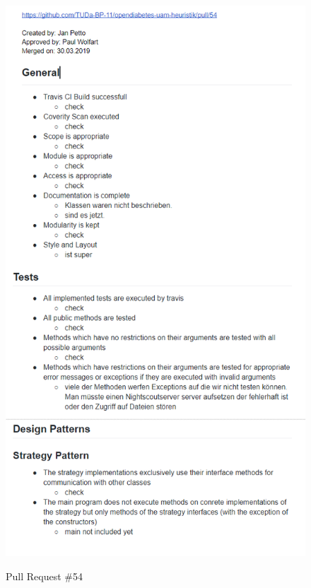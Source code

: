 \documentclass[accentcolor=tud0b,12pt,paper=a4]{tudreport}
\begin{document}
\begin{figure}[h]
\centering
\caption{Pull Request \#54}
\includegraphics[width=\textwidth,height=\textheight,keepaspectratio]{pr-54}
\label{pr:54}
\end{figure}
\end{document}
